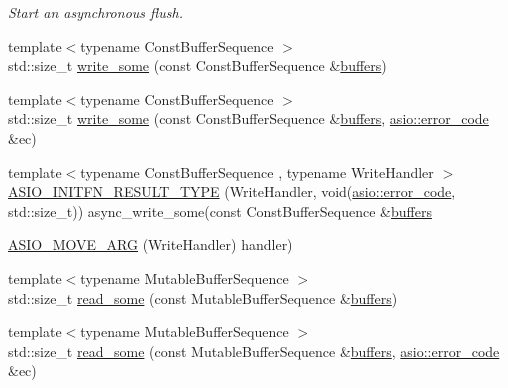 \begin{DoxyCompactItemize}
\begin{DoxyCompactList}\small\item\em Start an asynchronous flush. \end{DoxyCompactList}\item 
{\footnotesize template$<$typename Const\+Buffer\+Sequence $>$ }\\std\+::size\+\_\+t \hyperlink{classasio_1_1buffered__write__stream_a087d80b41a8ca12e6788222948eebd88}{write\+\_\+some} (const Const\+Buffer\+Sequence \&\hyperlink{group__async__read_ga54dede45c3175148a77fe6635222c47d}{buffers})
\item 
{\footnotesize template$<$typename Const\+Buffer\+Sequence $>$ }\\std\+::size\+\_\+t \hyperlink{classasio_1_1buffered__write__stream_acc1d946a2b73da5097909d35abcec65c}{write\+\_\+some} (const Const\+Buffer\+Sequence \&\hyperlink{group__async__read_ga54dede45c3175148a77fe6635222c47d}{buffers}, \hyperlink{classasio_1_1error__code}{asio\+::error\+\_\+code} \&ec)
\item 
{\footnotesize template$<$typename Const\+Buffer\+Sequence , typename Write\+Handler $>$ }\\\hyperlink{classasio_1_1buffered__write__stream_a60e307b7bb924c5fd07c4af14c197b75}{A\+S\+I\+O\+\_\+\+I\+N\+I\+T\+F\+N\+\_\+\+R\+E\+S\+U\+L\+T\+\_\+\+T\+Y\+P\+E} (Write\+Handler, void(\hyperlink{classasio_1_1error__code}{asio\+::error\+\_\+code}, std\+::size\+\_\+t)) async\+\_\+write\+\_\+some(const Const\+Buffer\+Sequence \&\hyperlink{group__async__read_ga54dede45c3175148a77fe6635222c47d}{buffers}
\item 
\hyperlink{classasio_1_1buffered__write__stream_a6d3210026a5f676a7fda22eb27f7d128}{A\+S\+I\+O\+\_\+\+M\+O\+V\+E\+\_\+\+A\+R\+G} (Write\+Handler) handler)
\item 
{\footnotesize template$<$typename Mutable\+Buffer\+Sequence $>$ }\\std\+::size\+\_\+t \hyperlink{classasio_1_1buffered__write__stream_a56e2b6c503166193e5688980dd0bd94c}{read\+\_\+some} (const Mutable\+Buffer\+Sequence \&\hyperlink{group__async__read_ga54dede45c3175148a77fe6635222c47d}{buffers})
\item 
{\footnotesize template$<$typename Mutable\+Buffer\+Sequence $>$ }\\std\+::size\+\_\+t \hyperlink{classasio_1_1buffered__write__stream_a86fb1b9c4d16604bce669594fc2e159f}{read\+\_\+some} (const Mutable\+Buffer\+Sequence \&\hyperlink{group__async__read_ga54dede45c3175148a77fe6635222c47d}{buffers}, \hyperlink{classasio_1_1error__code}{asio\+::error\+\_\+code} \&ec)

\end{DoxyCompactItemize}
